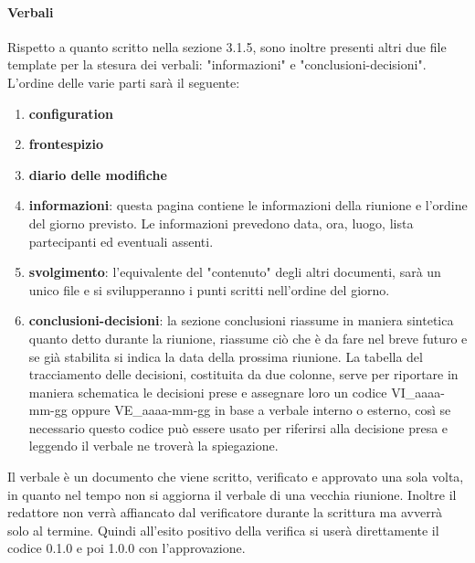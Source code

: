 \paragraph{Verbali} \hfill \linebreak
Rispetto a quanto scritto nella sezione 3.1.5, sono inoltre presenti altri due file template
per la stesura dei verbali: "informazioni" e "conclusioni-decisioni". \\
L'ordine delle varie parti sarà il seguente:
\begin{enumerate}
        \item \textbf{configuration}
        \item \textbf{frontespizio}
        \item \textbf{diario delle modifiche}
        \item \textbf{informazioni}:
                 questa pagina contiene le informazioni della riunione e l'ordine del giorno previsto.
                Le informazioni prevedono data, ora, luogo, lista partecipanti ed eventuali assenti.
        \item \textbf{svolgimento}:
                l'equivalente del "contenuto" degli altri documenti, sarà un unico file e si 
                svilupperanno i punti scritti nell'ordine del giorno.
        \item \textbf{conclusioni-decisioni}:
                la sezione conclusioni riassume in maniera sintetica quanto detto durante la riunione, 
                riassume ciò che è da fare nel breve futuro e se già stabilita si indica la data 
                della prossima riunione. \newline
                La tabella del tracciamento delle decisioni, costituita da due colonne, serve per 
                riportare in maniera schematica le decisioni prese e assegnare loro un codice 
                VI\_aaaa-mm-gg oppure VE\_aaaa-mm-gg in base a verbale interno o esterno, così 
                se necessario questo codice può essere usato per riferirsi alla decisione presa 
                e leggendo il verbale ne troverà la spiegazione.
\end{enumerate}
Il verbale è un documento che viene scritto, verificato e approvato una sola volta, 
in quanto nel tempo non si aggiorna il verbale di una vecchia riunione.
Inoltre il redattore non verrà affiancato dal verificatore durante la scrittura ma avverrà solo al termine. 
Quindi all'esito positivo della verifica si userà direttamente il codice 0.1.0 e poi 1.0.0 con l'approvazione.



